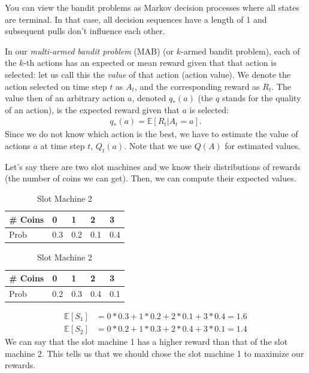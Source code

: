 You can view the bandit problems as Markov decision processes where all states are terminal. In that case, all decision sequences have a length of 1 and subsequent pulls don't influence each other.

In our \textit{multi-armed bandit problem} (MAB) (or $k$-armed bandit problem), each of the $k$-th actions has an expected or mean reward given that that action is selected: let us call this the \textit{value} of that action (\ie action value). We denote the action selected on time step $t$ as $A_t$, and the corresponding reward as $R_t$. The value then of an arbitrary action $a$, denoted $q_*(a)$ (\cf the $q$ stands for the quality of an action), is the expected reward given that $a$ is selected:
\begin{align*}
	q_*(a) = \mathbb{E}[R_t|A_t=a].
\end{align*}
Since we do not know which action is the best, we have to estimate the value of actions $a$ at time step $t$, $Q_t(a)$. Note that we use $Q(A)$ for estimated values. 

Let's say there are two slot machines and we know their distributions of rewards (\ie the number of coins we can get). Then, we can compute their expected values.
\begin{table}[h]
\begin{minipage}{0.6\textwidth}
\centering
\begin{tabular}{lllll}
\toprule
\# Coins & 0   & 1   & 2   & 3  \\
\midrule
Prob     & 0.3 & 0.2 & 0.1 & 0.4\\
\bottomrule
\end{tabular}
\caption{Slot Machine 1}
\end{minipage}%
\begin{minipage}{0.3\textwidth}
\centering
\begin{tabular}{lllll}
\toprule
\# Coins & 0   & 1   & 2   & 3  \\
\midrule
Prob     & 0.2 & 0.3 & 0.4 & 0.1\\
\bottomrule
\end{tabular}
\caption{Slot Machine 2}
\end{minipage}
\end{table}
\begin{align*}
	\mathbb{E}[S_1]&= 0*0.3+1*0.2+2*0.1+3*0.4 = 1.6 \\
	\mathbb{E}[S_2]&= 0*0.2+1*0.3+2*0.4+3*0.1 = 1.4
\end{align*}
We can say that the slot machine 1 has a higher reward than that of the slot machine 2. This tells us that we should chose the slot machine 1 to maximize our rewards. 

